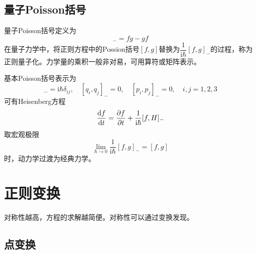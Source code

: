 \subsection{量子Poisson括号}

量子Poisson括号定义为
\begin{equation}
	[f,g]_{-} = fg - gf
\end{equation}
在量子力学中，将正则方程中的Possion括号$[f,g]$替换为$\dfrac{1}{\mathrm{i}\hbar} [f,g]_{-}$的过程，称为{\heiti 正则量子化}。力学量的乘积一般非对易，可用算符或矩阵表示。

基本Poisson括号表示为
\begin{equation}
	[q_i,p_j]_{-} = \mathrm{i} \hbar \delta_{ij},\quad [q_i,q_j]_{-} = 0,\quad [p_i,p_j]_{-} = 0,\quad i,j=1,2,3
\end{equation}
可有{\heiti Heisenberg方程}
\begin{equation}
	\frac{\mathrm{d} f}{\mathrm{d} t} = \frac{\partial f}{\partial t} + \frac{1}{\mathrm{i} \hbar} [f,H]_{-}
\end{equation}
取宏观极限
\begin{equation*}
	\lim_{\hbar \to 0} \frac{1}{\mathrm{i} \hbar} [f,g]_{-} = [f,g]
\end{equation*}
时，动力学过渡为经典力学。

\section{正则变换}

对称性越高，方程的求解越简便。对称性可以通过变换发现。

\subsection{点变换}

